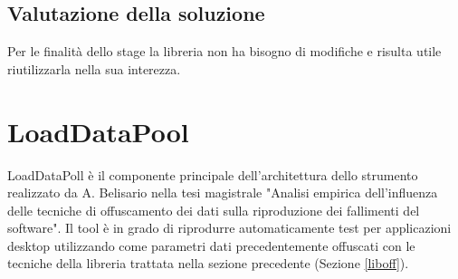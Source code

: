 \subsection{Valutazione della soluzione}
Per le finalità dello stage la libreria non ha bisogno di modifiche e risulta utile riutilizzarla nella sua interezza.

\newpage

\section{LoadDataPool}
\label{loaddatapool}
LoadDataPoll è il componente principale dell'architettura dello strumento realizzato da A. Belisario nella tesi magistrale "Analisi empirica dell’influenza delle tecniche di offuscamento dei dati sulla riproduzione dei fallimenti del software". Il tool è in grado di riprodurre automaticamente test per applicazioni desktop utilizzando come parametri dati precedentemente offuscati con le tecniche della libreria trattata nella sezione precedente (Sezione \ref{liboff}).
